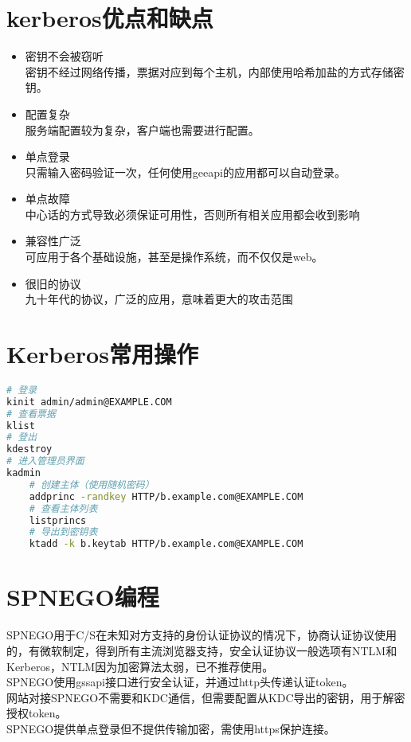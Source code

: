 \documentclass[a4paper]{scrartcl}
\begin{document}
\section{kerberos优点和缺点}
\begin{itemize}
    \item 密钥不会被窃听\\
    密钥不经过网络传播，票据对应到每个主机，内部使用哈希加盐的方式存储密钥。
    \item 配置复杂\\
    服务端配置较为复杂，客户端也需要进行配置。
    \item 单点登录\\
    只需输入密码验证一次，任何使用geeapi的应用都可以自动登录。
    \item 单点故障\\
    中心话的方式导致必须保证可用性，否则所有相关应用都会收到影响
    \item 兼容性广泛\\
    可应用于各个基础设施，甚至是操作系统，而不仅仅是web。
    \item 很旧的协议\\
    九十年代的协议，广泛的应用，意味着更大的攻击范围
\end{itemize}
\section{Kerberos常用操作}
\begin{lstlisting}[language={bash}]
# 登录
kinit admin/admin@EXAMPLE.COM
# 查看票据
klist
# 登出
kdestroy
# 进入管理员界面
kadmin
    # 创建主体（使用随机密码）
    addprinc -randkey HTTP/b.example.com@EXAMPLE.COM
    # 查看主体列表
    listprincs
    # 导出到密钥表
    ktadd -k b.keytab HTTP/b.example.com@EXAMPLE.COM

\end{lstlisting}

\clearpage
\section{SPNEGO编程}
SPNEGO用于C/S在未知对方支持的身份认证协议的情况下，协商认证协议使用的，有微软制定，得到所有主流浏览器支持，安全认证协议一般选项有NTLM和Kerberos，NTLM因为加密算法太弱，已不推荐使用。
\\
SPNEGO使用gssapi接口进行安全认证，并通过http头传递认证token。
\\
网站对接SPNEGO不需要和KDC通信，但需要配置从KDC导出的密钥，用于解密授权token。
\\
SPNEGO提供单点登录但不提供传输加密，需使用https保护连接。
\end{document}
